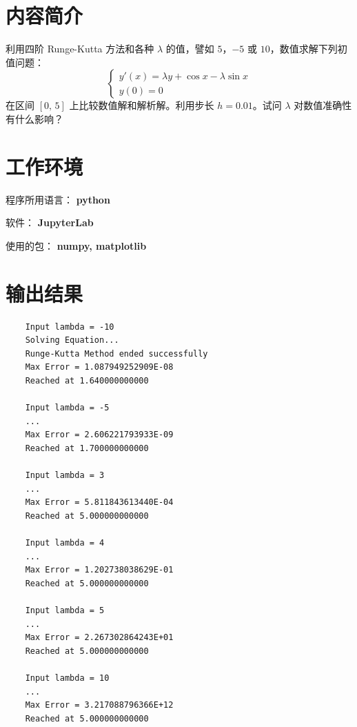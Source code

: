 \documentclass{ctexart}
\begin{document}
\section*{内容简介}
	\noindent 利用四阶 Runge-Kutta 方法和各种 $\lambda$ 的值，譬如 $5$，$-5$ 或 $10$，数值求解下列初值问题：
	\begin{equation}
	\begin{cases}
		y'(x) = \lambda y + \cos x - \lambda \sin x\\
		y(0) = 0
	\end{cases}
	\end{equation}
	在区间 $[0,\,5]$ 上比较数值解和解析解。利用步长 $h = 0.01$。试问 $\lambda$ 对数值准确性有什么影响？
\section*{工作环境}
	程序所用语言： {\bf python}
	
	软件： {\bf JupyterLab}
	
	使用的包： {\bf numpy, matplotlib}

\section*{输出结果}
\begin{verbatim}
	Input lambda = -10
	Solving Equation...
	Runge-Kutta Method ended successfully
	Max Error = 1.087949252909E-08
	Reached at 1.640000000000
	
	Input lambda = -5
	...
	Max Error = 2.606221793933E-09
	Reached at 1.700000000000
	
	Input lambda = 3
	...
	Max Error = 5.811843613440E-04
	Reached at 5.000000000000
	
	Input lambda = 4
	...
	Max Error = 1.202738038629E-01
	Reached at 5.000000000000
	
	Input lambda = 5
	...
	Max Error = 2.267302864243E+01
	Reached at 5.000000000000
	
	Input lambda = 10
	...
	Max Error = 3.217088796366E+12
	Reached at 5.000000000000
	
\end{verbatim}
\end{document}
